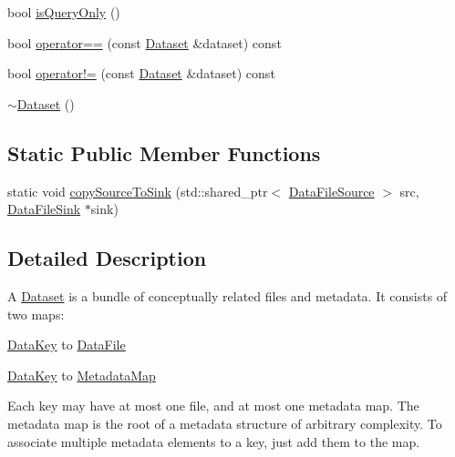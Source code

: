\begin{DoxyCompactItemize}
bool \hyperlink{classBUSBOY_1_1Dataset_a7dfe0e5162bfeaf7b0ae2dcf5d842dc5}{isQueryOnly} ()
\item 
bool \hyperlink{classBUSBOY_1_1Dataset_a18b50dbc0c385a74b2792573f7285266}{operator==} (const \hyperlink{classBUSBOY_1_1Dataset}{Dataset} \&dataset) const 
\item 
bool \hyperlink{classBUSBOY_1_1Dataset_af23f44e8c556cce885362632e449e9a7}{operator!=} (const \hyperlink{classBUSBOY_1_1Dataset}{Dataset} \&dataset) const 
\item 
\hyperlink{classBUSBOY_1_1Dataset_a0fe9b3b0bf6d816dadbe9295e55df8e9}{$\sim$Dataset} ()
\end{DoxyCompactItemize}
\subsection*{Static Public Member Functions}
\begin{DoxyCompactItemize}
\item 
static void \hyperlink{classBUSBOY_1_1Dataset_a91fcb7b7efa36f081b74f8aa44b82197}{copySourceToSink} (std::shared\_\-ptr$<$ \hyperlink{classBUSBOY_1_1DataFileSource}{DataFileSource} $>$ src, \hyperlink{classBUSBOY_1_1DataFileSink}{DataFileSink} $\ast$sink)
\end{DoxyCompactItemize}


\subsection{Detailed Description}
A \hyperlink{classBUSBOY_1_1Dataset}{Dataset} is a bundle of conceptually related files and metadata. It consists of two maps:
\begin{DoxyItemize}
\item \hyperlink{classBUSBOY_1_1DataKey}{DataKey} to \hyperlink{classBUSBOY_1_1DataFile}{DataFile}
\item \hyperlink{classBUSBOY_1_1DataKey}{DataKey} to \hyperlink{classBUSBOY_1_1MetadataMap}{MetadataMap}
\end{DoxyItemize}Each key may have at most one file, and at most one metadata map. The metadata map is the root of a metadata structure of arbitrary complexity. To associate multiple metadata elements to a key, just add them to the map. 

